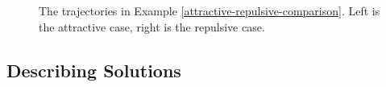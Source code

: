 \documentclass[11pt]{article}
\numberwithin{equation}{section}
\begin{document}
\begin{figure}
            \caption{The trajectories in Example \ref{attractive-repulsive-comparison}. Left is the attractive case, right is the repulsive case.}
            \label{fig:2-particle-ghost}
        \end{figure}

    \subsection{Describing Solutions}
        
\end{document}

